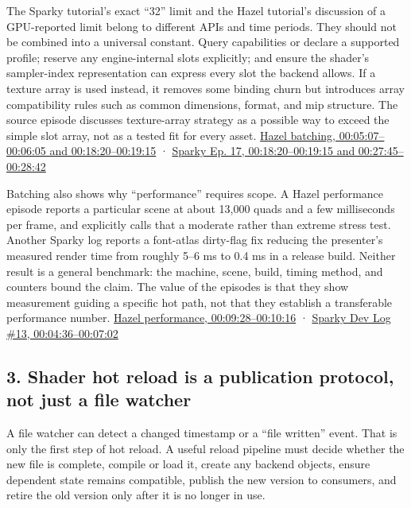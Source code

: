 The Sparky tutorial's exact ``32'' limit and the Hazel tutorial's discussion of a GPU-reported limit belong to different APIs and time periods. They should not be combined into a universal constant. Query capabilities or declare a supported profile; reserve any engine-internal slots explicitly; and ensure the shader's sampler-index representation can express every slot the backend allows. If a texture array is used instead, it removes some binding churn but introduces array compatibility rules such as common dimensions, format, and mip structure. The source episode discusses texture-array strategy as a possible way to exceed the simple slot array, not as a tested fit for every asset. \href{https://www.youtube.com/watch?v=Fz1VySWaad8&t=5m7s}{Hazel batching, 00:05:07--00:06:05 and 00:18:20--00:19:15} · \href{https://www.youtube.com/watch?v=1x4hrdS97cI&t=18m20s}{Sparky Ep. 17, 00:18:20--00:19:15 and 00:27:45--00:28:42}

Batching also shows why ``performance'' requires scope. A Hazel performance episode reports a particular scene at about 13,000 quads and a few milliseconds per frame, and explicitly calls that a moderate rather than extreme stress test. Another Sparky log reports a font-atlas dirty-flag fix reducing the presenter's measured render time from roughly 5--6 ms to 0.4 ms in a release build. Neither result is a general benchmark: the machine, scene, build, timing method, and counters bound the claim. The value of the episodes is that they show measurement guiding a specific hot path, not that they establish a transferable performance number. \href{https://www.youtube.com/watch?v=Yw7RpvmqvSE&t=9m28s}{Hazel performance, 00:09:28--00:10:16} · \href{https://www.youtube.com/watch?v=njTgcayfhJU&t=4m36s}{Sparky Dev Log \#13, 00:04:36--00:07:02}

\subsection{3. Shader hot reload is a publication protocol, not just a file watcher}\label{06-engine-ii-ch041-shader-hot-reload-is-a-publication-protocol-not-just-a-file-watcher}

\hypertarget{06-engine-ii-ch041-shader-hot-reload-is-a-publication-protocol-not-just-a-file-watcher}{}

A file watcher can detect a changed timestamp or a ``file written'' event. That is only the first step of hot reload. A useful reload pipeline must decide whether the new file is complete, compile or load it, create any backend objects, ensure dependent state remains compatible, publish the new version to consumers, and retire the old version only after it is no longer in use.

